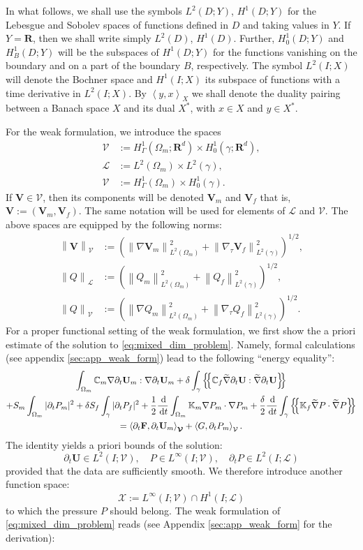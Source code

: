 \documentclass[a4paper]{article}
\numberwithin{equation}{section}
\def\agrad{\widetilde\nabla}
\def\avg#1{\left\{\mskip-5mu\left\{#1\right\}\mskip-5mu\right\}}
\def\CC{\tn C}
\def\d {\,{\rm d}}
\def\ddt#1{\frac{\d #1}{\d t}}
\def\dt{\prtl_t}
\def\dual#1#2{\left\langle #1,#2\right\rangle}
\def\FF{\vc F}
\def\Hf{\mathscr{L}} %
\def\norm#1{\left\|#1\right\|}
\def\prtl{\partial}
\def\Real{{\mathbf R}} %
\def\tn#1{{\mathbb{#1}}}    %
\def\U{\vc U}
\def\V{\vc V}
\def\Vel{{\boldsymbol{\mathcal V}}} %
\def\Vf{{\mathcal V}} %
\def\vc#1{\mathbf{#1}}     %
\newcommand{\eqs}[1]{\begin{equation*}#1\end{equation*}}
\newcommand{\ml}[1]{\begin{multline}#1\end{multline}}
\begin{document}
In what follows, we shall use the symbols $L^2(D;Y)$, $H^1(D;Y)$ for the Lebesgue and Sobolev spaces of functions defined in $D$ and taking values in $Y$.
If $Y=\Real$, then we shall write simply $L^2(D)$, $H^1(D)$.
Further, $H^1_0(D;Y)$ and $H^1_B(D;Y)$ will be the subspaces of $H^1(D;Y)$ for the functions vanishing on the boundary and on a part of the boundary $B$, respectively.
The symbol $L^2( I;X)$ will denote the Bochner space and $H^1( I;X)$ its subspace of functions with a time derivative in $L^2( I;X)$.
By $\dual{y}{x}_X$ we shall denote the duality pairing between a Banach space $X$ and its dual $X^*$, with $x\in X$ and $y\in X^*$.

For the weak formulation, we introduce the spaces
\begin{align*}
\Vel &:= H^1_\Gamma(\Omega_m;\Real^d)\times H^1_0(\gamma;\Real^d),\\
\Hf &:= L^2(\Omega_m)\times L^2(\gamma),\\
\Vf &:= H^1_\Gamma(\Omega_m)\times H^1_0(\gamma).
\end{align*}
If $\V\in\Vel$, then its components will be denoted $\V_m$ and $\V_f$ that is, $\V:=(\V_m,\V_f)$.
The same notation will be used for elements of $\Hf$ and $\Vf$.
The above spaces are equipped by the following norms:
\begin{align*}
\norm{\V}_\Vel &:= (\norm{\nabla\V_m}_{L^2(\Omega_m)}^2 + \norm{\nabla_\tau\V_f}_{L^2(\gamma)}^2)^{1/2},\\
\norm{Q}_\Hf &:= (\norm{Q_m}_{L^2(\Omega_m)}^2 + \norm{Q_f}_{L^2(\gamma)}^2)^{1/2},\\
\norm{Q}_\Vf &:= (\norm{\nabla Q_m}_{L^2(\Omega_m)}^2 + \norm{\nabla_\tau Q_f}_{L^2(\gamma)}^2)^{1/2}.
\end{align*}
For a proper functional setting of the weak formulation, we first show the a priori estimate of the solution to \eqref{eq:mixed_dim_problem}.
Namely, formal calculations (see appendix \ref{sec:app_weak_form}) lead to the following ``energy equality'':
\ml{ \label{eq:apriori_biot} \int_{\Omega_m}\CC_m\nabla\dt\U_m:\nabla\dt\U_m + \delta\int_\gamma\avg{\CC_f\agrad\dt\U:\agrad\dt\U}\\
+ S_m\int_{\Omega_m}|\dt P_m|^2 + \delta S_f\int_\gamma|\dt P_f|^2
+ \frac12\ddt{}\int_{\Omega_m}\tn K_m\nabla P_m\cdot\nabla P_m
+ \frac\delta2\ddt{}\int_\gamma\avg{\tn K_f\agrad P\cdot\agrad P}\\
= \dual{\dt\FF}{\dt{\U_m}}_{\Vel} + \dual{G}{\dt P_m}_{\Vf}. }
The identity yields a priori bounds of the solution:
\eqs{ \dt\U\in L^2(I;\Vel),\quad P\in L^\infty(I;\Vf),\quad \dt P\in L^2(I;\Hf) }
provided that the data are sufficiently smooth.
% 
We therefore introduce another function space:
\eqs{ \mathcal X := L^\infty( I;\Vf)\cap H^1( I;\Hf) }
to which the pressure $P$ should belong.
The weak formulation of \eqref{eq:mixed_dim_problem} reads (see Appendix \ref{sec:app_weak_form} for the derivation):
\end{document}
